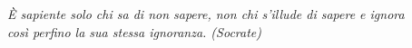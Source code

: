 \begin{titlepage}

\nonumber
\null {}
	\begin{flushright}
\textit{È sapiente solo chi sa di non sapere, non chi s’illude di sapere e ignora\\ così perfino la sua stessa ignoranza. (Socrate)} \\[5mm]
	\end{flushright}



\end{titlepage}